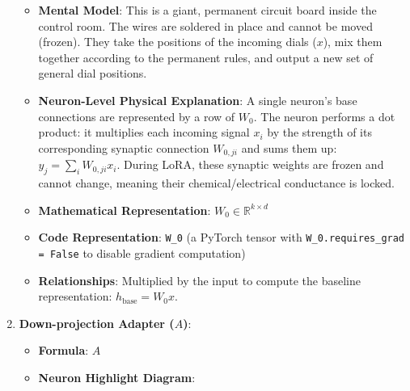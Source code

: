 \begin{enumerate}
\begin{itemize}
      \item \textbf{Mental Model}: This is a giant, permanent circuit board inside the control room. The wires are soldered in place and cannot be moved (frozen). They take the positions of the incoming dials ($x$), mix them together according to the permanent rules, and output a new set of general dial positions.
      \item \textbf{Neuron-Level Physical Explanation}: A single neuron's base connections are represented by a row of $W_0$. The neuron performs a dot product: it multiplies each incoming signal $x_i$ by the strength of its corresponding synaptic connection $W_{0, ji}$ and sums them up: $y_j = \sum_i W_{0, ji} x_i$. During LoRA, these synaptic weights are frozen and cannot change, meaning their chemical/electrical conductance is locked.
      \item \textbf{Mathematical Representation}: $W_0 \in \mathbb{R}^{k \times d}$
      \item \textbf{Code Representation}: \texttt{W\_0} (a PyTorch tensor with \texttt{W\_0.requires\_grad = False} to disable gradient computation)
      \item \textbf{Relationships}: Multiplied by the input to compute the baseline representation: $h_{\text{base}} = W_0 x$.
    \end{itemize}

  \item \textbf{Down-projection Adapter ($A$)}:
    \begin{itemize}
      \item \textbf{Formula}: $A$
      \item \textbf{Neuron Highlight Diagram}:

\begin{center}
\begin{adjustbox}{max width=0.85\linewidth}
\end{adjustbox}
\end{center}
\end{itemize}
\end{enumerate}
